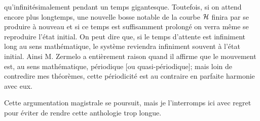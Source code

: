 {qu'infinit\'esimalement pendant un temps gigantesque. Toutefois, si 
on attend encore plus longtemps, une nouvelle bosse notable de la 
courbe ${\cal H}$ finira par se produire \`a nouveau et si ce temps est 
suffisamment prolong\'e on verra m\^eme se reproduire l'\'etat initial. 
On peut dire que, si le temps d'attente est infiniment long au sens 
math\'ematique, le syst\`eme reviendra infiniment souvent \`a l'\'etat 
initial. 
\smallskip
Ainsi M. Zermelo a enti\`erement raison quand il affirme que le mouvement 
est, au sens math\'ematique, p\'eriodique [ou quasi-p\'eriodique]; 
mais loin de contredire mes th\'eor\`emes, cette p\'eriodicit\'e est au 
contraire en parfaite harmonie avec eux.
\smallskip
{} \par }
\medskip
Cette argumentation magistrale se poursuit, mais je l'interromps ici 
avec regret pour \'eviter de rendre cette anthologie trop longue. 

\bigskip

